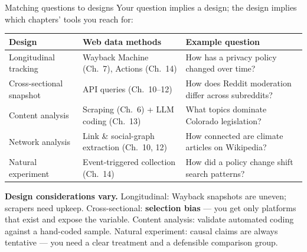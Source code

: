 \documentclass[9pt,aspectratio=169]{beamer}
\begin{document}
\begin{frame}{Matching questions to designs}
    Your question implies a design; the design implies which chapters' tools you reach for:
    \begin{center}\small
    \begin{tabular}{@{}p{}p{}p{}@{}}
        \toprule
        \textbf{Design} & \textbf{Web data methods} & \textbf{Example question} \\
        \midrule
        Longitudinal tracking & Wayback Machine (Ch.~7), Actions (Ch.~14) & How has a privacy policy changed over time? \\
        Cross-sectional snapshot & API queries (Ch.~10--12) & How does Reddit moderation differ across subreddits? \\
        Content analysis & Scraping (Ch.~6) + LLM coding (Ch.~13) & What topics dominate Colorado legislation? \\
        Network analysis & Link \& social-graph extraction (Ch.~10, 12) & How connected are climate articles on Wikipedia? \\
        Natural experiment & Event-triggered collection (Ch.~14) & How did a policy change shift search patterns? \\
        \bottomrule
    \end{tabular}
    \end{center}
    \vspace{-0.1em}
    {\footnotesize \textbf{Design considerations vary.} Longitudinal: Wayback snapshots are uneven; scrapers need upkeep. Cross-sectional: \textbf{selection bias} --- you get only platforms that exist and expose the variable. Content analysis: validate automated coding against a hand-coded sample. Natural experiment: causal claims are always tentative --- you need a clear treatment and a defensible comparison group.}
\end{frame}
\end{document}
